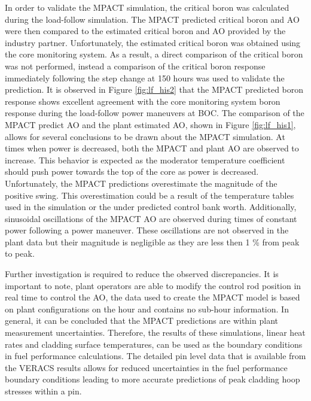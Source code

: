 \documentclass[edeposit,fullpage,11pt]{uiucthesis2009}
\begin{document}
In order to validate the MPACT simulation, the critical boron was calculated during the load-follow simulation. 
The MPACT predicted critical boron and \gls{AO} were then compared to the estimated critical boron and \gls{AO} provided by the industry partner.
Unfortunately, the estimated critical boron was obtained using the core monitoring system.
As a result, a direct comparison of the critical boron was not performed, instead a comparison of the critical boron response immediately following the step change at 150 hours was used to validate the prediction.
It is observed in Figure \ref{fig:lf_his2} that the MPACT predicted boron response shows excellent agreement with the core monitoring system boron response during the load-follow power maneuvers at \gls{BOC}.
The comparison of the MPACT predict \gls{AO} and the plant estimated \gls{AO}, shown in Figure \ref{fig:lf_his1}, allows for several conclusions to be drawn about the MPACT simulation.
At times when power is decreased, both the MPACT and plant \gls{AO} are observed to increase.
This behavior is expected as the moderator temperature coefficient should push power towards the top of the core as power is decreased.
Unfortunately, the MPACT predictions overestimate the magnitude of the positive swing.
This overestimation could be a result of the temperature tables used in the simulation or the under predicted control bank worth.
Additionally, sinusoidal oscillations of the MPACT \gls{AO} are observed during times of constant power following a power maneuver.
These oscillations are not observed in the plant data but their magnitude is negligible as they are less then 1 \% from peak to peak.
  
Further investigation is required to reduce the observed discrepancies.
It is important to note, plant operators are able to modify the control rod position in real time to control the \gls{AO}, the data used to create the MPACT model is based on plant configurations on the hour and contains no sub-hour information.
In general, it can be concluded that the MPACT predictions are within plant measurement uncertainties.
Therefore, the results of these simulations, linear heat rates and cladding surface temperatures, can be used as the boundary conditions in fuel performance calculations.
The detailed pin level data that is available from the \gls{VERACS} results allows for reduced uncertainties in the fuel performance boundary conditions leading to more accurate predictions of peak cladding hoop stresses within a pin.

\end{document}
